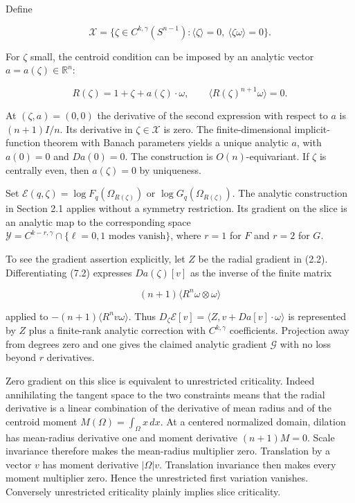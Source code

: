 \documentclass[11pt]{article}
\begin{document}
Define

\[
\mathcal X=\{\zeta\in C^{k,\gamma}(S^{n-1}):
\langle\zeta\rangle=0,\ \langle\zeta\omega\rangle=0\}.
\tag{7.1}
\]

For \(\zeta\) small, the centroid condition can be imposed by an
analytic vector \(a=a(\zeta)\in\mathbb R^n\):

\[
R(\zeta)=1+\zeta+a(\zeta)\cdot\omega,
\qquad \langle R(\zeta)^{n+1}\omega\rangle=0.
\tag{7.2}
\]

At \((\zeta,a)=(0,0)\) the derivative of the second expression with
respect to \(a\) is \((n+1)I/n\). Its derivative in
\(\zeta\in\mathcal X\) is zero. The finite-dimensional implicit-function
theorem with Banach parameters yields a unique analytic \(a\), with
\(a(0)=0\) and \(Da(0)=0\). The construction is \(O(n)\)-equivariant. If
\(\zeta\) is centrally even, then \(a(\zeta)=0\) by uniqueness.

Set \(\mathcal E(q,\zeta)=\log F_q(\Omega_{R(\zeta)})\) or
\(\log G_q(\Omega_{R(\zeta)})\). The analytic construction in Section
2.1 applies without a symmetry restriction. Its gradient on the slice is
an analytic map to the corresponding space
\(\mathcal Y=C^{k-r,\gamma}\cap\{\ell=0,1\text{ modes vanish}\}\), where
\(r=1\) for \(F\) and \(r=2\) for \(G\).

To see the gradient assertion explicitly, let \(Z\) be the radial
gradient in (2.2). Differentiating (7.2) expresses \(Da(\zeta)[v]\) as
the inverse of the finite matrix

\[
(n+1)\langle R^n\omega\otimes\omega\rangle
\tag{7.3}
\]

applied to \(-(n+1)\langle R^n v\omega\rangle\). Thus
\(D_\zeta\mathcal E[v]=\langle Z,v+Da[v]\cdot\omega\rangle\) is
represented by \(Z\) plus a finite-rank analytic correction with
\(C^{k,\gamma}\) coefficients. Projection away from degrees zero and one
gives the claimed analytic gradient \(\mathcal G\) with no loss beyond
\(r\) derivatives.

Zero gradient on this slice is equivalent to unrestricted criticality.
Indeed annihilating the tangent space to the two constraints means that
the radial derivative is a linear combination of the derivative of mean
radius and of the centroid moment \(M(\Omega)=\int_\Omega x\,dx\). At a
centered normalized domain, dilation has mean-radius derivative one and
moment derivative \((n+1)M=0\). Scale invariance therefore makes the
mean-radius multiplier zero. Translation by a vector \(v\) has moment
derivative \(|\Omega|v\). Translation invariance then makes every moment
multiplier zero. Hence the unrestricted first variation vanishes.
Conversely unrestricted criticality plainly implies slice criticality.
\end{document}

